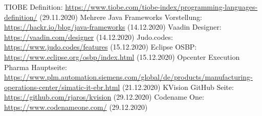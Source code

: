\documentclass[ngerman]{article}
\begin{document}
\begin{thebibliography}{9}
        TIOBE Definition: \url{https://www.tiobe.com/tiobe-index/programming-languages-definition/} (29.11.2020)
        Mehrere Java Frameworks Vorstellung: \url{https://hackr.io/blog/java-frameworks} (14.12.2020)
        Vaadin Designer: \url{https://vaadin.com/designer} (14.12.2020)
        Judo.codes: \url{https://www.judo.codes/features} (15.12.2020)
        Eclipse OSBP: \url{https://www.eclipse.org/osbp/index.html} (15.12.2020)
        Opcenter Execution Pharma Hauptseite: \url{https://www.plm.automation.siemens.com/global/de/products/manufacturing-operations-center/simatic-it-ebr.html} (21.12.2020)
        KVision GitHub Seite: \url{https://github.com/rjaros/kvision} (29.12.2020)
        Codename One: \url{https://www.codenameone.com/} (29.12.2020)
    \end{thebibliography}
\end{document}
